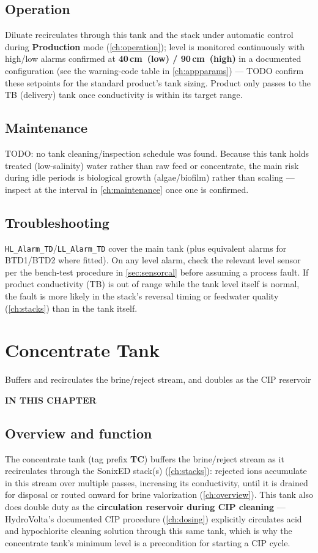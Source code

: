 \documentclass[a4paper,11pt,twoside,openright,numbers=noenddot]{scrreprt}
\newcommand{\chaptersubtitle}[1]{%
  \vspace{-12pt}\par
  {\sffamily\fontsize{13}{17}\selectfont\color{hvmuted}\raggedright #1\par}
  \vspace{10pt}}
\newcommand{\chaptertoc}{%
  \begingroup
  \etocsetnexttocdepth{1}%
  \etocsettocstyle
    {{\sffamily\bfseries\footnotesize\color{hvmuted}IN THIS CHAPTER\par}%
     \vspace{5pt}{\color{hvink}\rule{\linewidth}{1.2pt}}\par\vspace{2pt}}{}%
  \etocsetstyle{section}{}{}
    {\par\vspace{4pt}\noindent
     \makebox[11mm][l]{\sffamily\bfseries\small\color{hvprimary}\etocnumber}%
     \sffamily\small\etocname\hfill{\color{hvmuted}\etocpage}%
     \par\vspace{4pt}{\color{hvrule}\rule{\linewidth}{0.4pt}}}{}%
  \localtableofcontents
  \endgroup}
\newcommand{\plctag}[1]{\texttt{\small #1}}
\newcommand{\sonixed}{SonixED\texttrademark\xspace}
\begin{document}
\section{Operation}
Diluate recirculates through this tank and the stack under automatic
control during \textbf{Production} mode (\cref{ch:operation}); level is
monitored continuously with high/low alarms confirmed at
\textbf{40\,cm~(low) / 90\,cm~(high)} in a documented configuration (see
the warning-code table in \cref{ch:appparams}) --- TODO confirm these
setpoints for the standard product's tank sizing. Product only passes to
the TB (delivery) tank once conductivity is within its target range.

\section{Maintenance}
TODO: no tank cleaning/inspection schedule was found. Because this tank
holds treated (low-salinity) water rather than raw feed or concentrate,
the main risk during idle periods is biological growth (algae/biofilm)
rather than scaling --- inspect at the interval in
\cref{ch:maintenance} once one is confirmed.

\section{Troubleshooting}
\plctag{HL\_Alarm\_TD}/\plctag{LL\_Alarm\_TD} cover the main tank (plus
equivalent alarms for BTD1/BTD2 where fitted). On any level alarm, check
the relevant level sensor per the bench-test procedure in
\cref{sec:sensorcal} before assuming a process fault. If product
conductivity (TB) is out of range while the tank level itself is normal,
the fault is more likely in the stack's reversal timing or feedwater
quality (\cref{ch:stacks}) than in the tank itself.


\chapter{Concentrate Tank}
\label{ch:tankconcentrate}
\chaptersubtitle{Buffers and recirculates the brine/reject stream, and doubles as the CIP reservoir}
\chaptertoc

\section{Overview and function}
The concentrate tank (tag prefix \textbf{TC}) buffers the brine/reject
stream as it recirculates through the \sonixed stack(s)
(\cref{ch:stacks}): rejected ions accumulate in this stream over multiple
passes, increasing its conductivity, until it is drained for disposal or
routed onward for brine valorization (\cref{ch:overview}). This tank also
does double duty as the \textbf{circulation reservoir during CIP
cleaning} --- HydroVolta's documented CIP procedure (\cref{ch:dosing})
explicitly circulates acid and hypochlorite cleaning solution through
this same tank, which is why the concentrate tank's minimum level is a
precondition for starting a CIP cycle.
\end{document}
